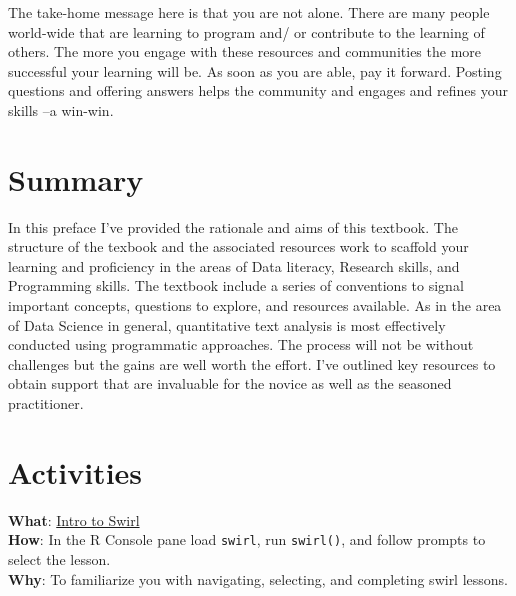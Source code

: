 \documentclass[
  letterpaper,
]{latex/krantz}
\begin{document}
The take-home message here is that you are not alone. There are many
people world-wide that are learning to program and/ or contribute to the
learning of others. The more you engage with these resources and
communities the more successful your learning will be. As soon as you
are able, pay it forward. Posting questions and offering answers helps
the community and engages and refines your skills --a win-win.

\hypertarget{summary}{%
\section*{Summary}\label{summary}}

In this preface I've provided the rationale and aims of this textbook.
The structure of the texbook and the associated resources work to
scaffold your learning and proficiency in the areas of Data literacy,
Research skills, and Programming skills. The textbook include a series
of conventions to signal important concepts, questions to explore, and
resources available. As in the area of Data Science in general,
quantitative text analysis is most effectively conducted using
programmatic approaches. The process will not be without challenges but
the gains are well worth the effort. I've outlined key resources to
obtain support that are invaluable for the novice as well as the
seasoned practitioner.

\hypertarget{activities}{%
\section*{Activities}\label{activities}}

\begin{tcolorbox}[enhanced jigsaw, opacitybacktitle=0.6, breakable, colframe=quarto-callout-note-color-frame, arc=.35mm, left=2mm, leftrule=.75mm, title=\textcolor{quarto-callout-note-color}{\faInfo}\hspace{0.5em}{Swirl}, opacityback=0, colback=white, toptitle=1mm, rightrule=.15mm, titlerule=0mm, bottomtitle=1mm, bottomrule=.15mm, coltitle=black, colbacktitle=quarto-callout-note-color!10!white, toprule=.15mm]
\textbf{What}: \href{https://github.com/lin380/swirl}{Intro to Swirl}\\
\textbf{How}: In the R Console pane load \texttt{swirl}, run
\texttt{swirl()}, and follow prompts to select the lesson.\\
\textbf{Why}: To familiarize you with navigating, selecting, and
completing swirl lessons.
\end{tcolorbox}
\end{document}
